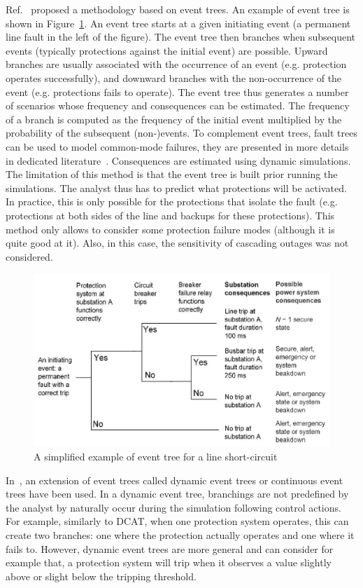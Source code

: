Ref.~\cite{Haarla, GridPSA} proposed a methodology based on event trees. An example of event tree is shown in Figure~\ref{fig:eventTree}. An event tree starts at a given initiating event (a permanent line fault in the left of the figure). The event tree then branches when subsequent events (typically protections against the initial event) are possible. Upward branches are usually associated with the occurrence of an event (e.g. protection operates successfully), and downward branches with the non-occurrence of the event (e.g. protections fails to operate). The event tree thus generates a number of scenarios whose frequency and consequences can be estimated. The frequency of a branch is computed as the frequency of the initial event multiplied by the probability of the subsequent (non-)events. To complement event trees, fault trees can be used to model common-mode failures, they are presented in more details in dedicated literature~\cite{FaultTreeHandbook}. Consequences are estimated using dynamic simulations. The limitation of this method is that the event tree is built prior running the simulations. The analyst thus has to predict what protections will be activated. In practice, this is only possible for the protections that isolate the fault (e.g. protections at both sides of the line and backups for these protections). This method only allows to consider some protection failure modes (although it is quite good at it). Also, in this case, the sensitivity of cascading outages was not considered.

\begin{figure}
    \centering
    \includegraphics[width=0.8\linewidth]{Figs/EventTree.png}
    \caption{A simplified example of event tree for a line short-circuit~\cite{GridPSA}}
    \label{fig:eventTree}
\end{figure}

In~\cite{TwoLevelPSA, Faghihi}, an extension of event trees called dynamic event trees or continuous event trees have been used. In a dynamic event tree, branchings are not predefined by the analyst by naturally occur during the simulation following control actions. For example, similarly to DCAT, when one protection system operates, this can create two branches: one where the protection actually operates and one where it fails to. However, dynamic event trees are more general and can consider for example that, a protection system will trip when it observes a value slightly above or slight below the tripping threshold.

